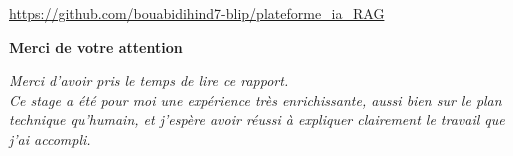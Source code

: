 \documentclass[12pt,a4paper]{report}
\begin{document}
\begin{center}
    \url{https://github.com/bouabidihind7-blip/plateforme_ia_RAG}
\end{center}

\clearpage
\thispagestyle{empty}
\vspace*{\fill}
\begin{center}
{\Large\bfseries\color{bleufonce} Merci de votre attention}

\vspace{1cm}
{\normalsize\itshape Merci d'avoir pris le temps de lire ce rapport.\\
Ce stage a été pour moi une expérience très enrichissante, aussi bien
sur le plan technique qu'humain, et j'espère avoir réussi à expliquer
clairement le travail que j'ai accompli.}
\end{center}
\vspace*{\fill}
\end{document}
